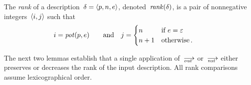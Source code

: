 
\begin{definition}
  \label{def.rank}
  The \emph{rank} of a description~$\delta=\<p,n,e>$,
  denoted~$\operatorname{\mathit{rank}}(\delta)$, is a pair of nonnegative integers~$\<i,j>$ such
  that
  \begin{alignat*}{2}
    i&=\operatorname{\mathit{pot}}(p,e) &\quad\text{and}\quad
    j&=
       \begin{cases}
         n  &\text{if~$e=\varepsilon$}\\
         n+1&\text{otherwise\,.}
       \end{cases}
  \end{alignat*}
\end{definition}

The next two lemmas establish that a single application of~$\out$ or~$\nst$
either preserves or decreases the rank of the input description.  All rank
comparisons assume lexicographical order.

